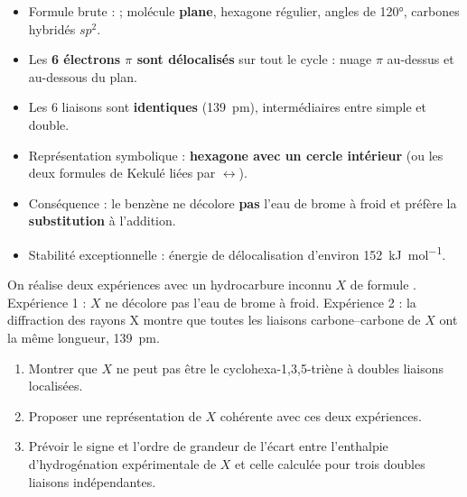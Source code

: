 \documentclass[11pt]{article}
\begin{document}
\begin{aretenir}
\begin{itemize}
\item Formule brute :  ; molécule \textbf{plane}, hexagone régulier, angles de \ang{120}, carbones hybridés $sp^2$.
\item Les \textbf{6 électrons $\pi$ sont délocalisés} sur tout le cycle : nuage $\pi$ au-dessus et au-dessous du plan.
\item Les 6 liaisons  sont \textbf{identiques} (\SI{139}{pm}), intermédiaires entre simple et double.
\item Représentation symbolique : \textbf{hexagone avec un cercle intérieur} (ou les deux formules de Kekulé liées par $\leftrightarrow$).
\item Conséquence : le benzène ne décolore \textbf{pas} l'eau de brome à froid et préfère la \textbf{substitution} à l'addition.
\item Stabilité exceptionnelle : énergie de délocalisation d'environ \SI{152}{kJ.mol^{-1}}.
\end{itemize}
\end{aretenir}

\begin{exercice}
On réalise deux expériences avec un hydrocarbure inconnu $X$ de formule . Expérience 1 : $X$ ne décolore pas l'eau de brome à froid. Expérience 2 : la diffraction des rayons X montre que toutes les liaisons carbone--carbone de $X$ ont la même longueur, \SI{139}{pm}.
\begin{enumerate}
\item Montrer que $X$ ne peut pas être le cyclohexa-1,3,5-triène à doubles liaisons localisées.
\item Proposer une représentation de $X$ cohérente avec ces deux expériences.
\item Prévoir le signe et l'ordre de grandeur de l'écart entre l'enthalpie d'hydrogénation expérimentale de $X$ et celle calculée pour trois doubles liaisons indépendantes.
\end{enumerate}
\end{exercice}
\end{document}
